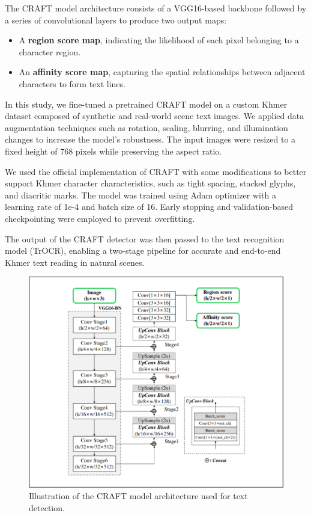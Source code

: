 The CRAFT model architecture consists of a VGG16-based backbone followed by a series 
of convolutional layers to produce two output maps:
\begin{itemize}
\item A \textbf{region score map}, indicating the likelihood of each pixel belonging 
to a character region.
\item An \textbf{affinity score map}, capturing the spatial relationships between 
adjacent characters to form text lines.
\end{itemize}

In this study, we fine-tuned a pretrained CRAFT model on a custom Khmer dataset 
composed of synthetic and real-world scene text images. We applied data augmentation 
techniques such as rotation, scaling, blurring, and illumination changes to increase 
the model's robustness. The input images were resized to a fixed height of 768 pixels 
while preserving the aspect ratio.

We used the official implementation of CRAFT with some modifications to better support
Khmer character characteristics, such as tight spacing, stacked glyphs, and diacritic 
marks. The model was trained using Adam optimizer with a learning rate of 1e-4 and batch 
size of 16. Early stopping and validation-based checkpointing were employed to 
prevent overfitting.

The output of the CRAFT detector was then passed to the text recognition 
model (TrOCR), enabling a two-stage pipeline for accurate and end-to-end 
Khmer text reading in natural scenes.

\begin{figure}[ht]
    \centering
    \includegraphics[width=\textwidth]{figures/craft_model.png}
    \caption{Illustration of the CRAFT model architecture used for text detection. \cite{baek2019craft}}
    \label{fig:craft-model}
\end{figure}


